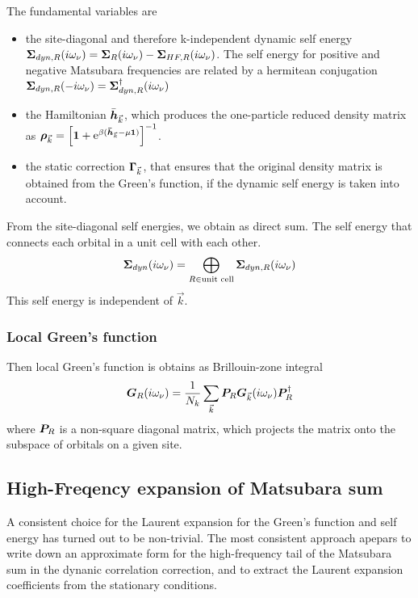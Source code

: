\documentclass[11pt,a4paper]{report}
\begin{document}
The fundamental variables are
\begin{itemize}
\item the site-diagonal and therefore k-independent dynamic self
  energy $\bm{\Sigma}_{dyn,R}(i\omega_\nu)=
  \bm{\Sigma}_{R}(i\omega_\nu)
  -\bm{\Sigma}_{HF,R}(i\omega_\nu)$. The self energy for positive and
  negative Matsubara frequencies are related by a hermitean
  conjugation
  $\bm{\Sigma}_{dyn,R}(-i\omega_\nu)=\bm{\Sigma}_{dyn,R}^\dagger(i\omega_\nu)$
%
\item the Hamiltonian $\bar{\bm{h}}_{\vec{k}}$, which produces the
  one-particle reduced density matrix as $\bm{\rho}_{\vec{k}}
  =\Bigl[\bm{1}+\mathrm{e}^{\beta(\bm{\bar{h}}_{\vec{k}}-\mu\bm{1})}\Bigr]^{-1}$.
%
\item the static correction $\bm{\Gamma}_{\vec{k}}$, that ensures
  that the original density matrix is obtained from the Green's
  function, if the dynamic self energy is taken into account.
\end{itemize}

From the site-diagonal self energies, we obtain as direct sum. The self
energy that connects each orbital in a unit cell with each other. 
\begin{eqnarray}
\bm{\Sigma}_{dyn}(i\omega_\nu)=\bigoplus_{R\in\text{unit cell}}
\bm{\Sigma}_{dyn,R}(i\omega_\nu)
\label{eq:sigmafromlocal}
\end{eqnarray}
This self energy is independent of $\vec{k}$.


\subsubsection{Local Green's function}
Then local Green's function is obtains as Brillouin-zone integral
\begin{eqnarray}
\bm{G}_{R}(i\omega_\nu)
=\frac{1}{N_k}\sum_{\vec{k}}\bm{P}_R\bm{G}_{\vec{k}}(i\omega_\nu)
\bm{P}^\dagger_R
\label{eq:deflocalgreen}
\end{eqnarray}
where $\bm{P}_R$ is a non-square diagonal matrix, which projects the
matrix onto the subspace of orbitals on a given site.




\subsection{High-Freqency expansion of Matsubara sum}
A consistent choice for the Laurent expansion for the Green's function
and self energy has turned out to be non-trivial. The most consistent
approach apepars to write down an approximate form for the
high-frequency tail of the Matsubara sum in the dynanic correlation
correction, and to extract the Laurent expansion coefficients from the
stationary conditions.
\end{document}
